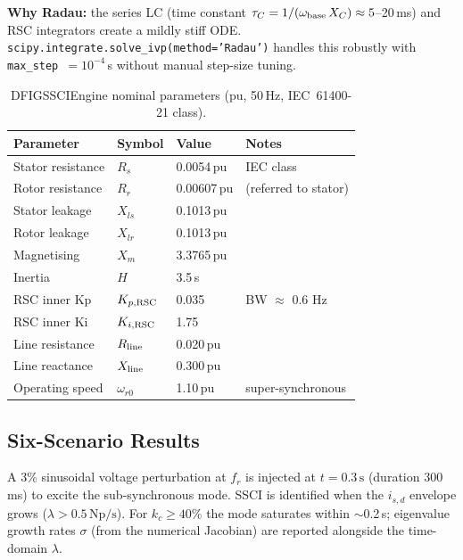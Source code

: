 \documentclass[11pt, a4paper]{article}
\begin{document}
\noindent\textbf{Why Radau:} the series LC (time constant
$\tau_C = 1/(\omega_{\rm base}\,X_C) \approx 5$--20\,ms) and RSC integrators
create a mildly stiff ODE.  \texttt{scipy.integrate.solve\_ivp(method='Radau')}
handles this robustly with \texttt{max\_step}~$= 10^{-4}$\,s without manual
step-size tuning.

\begin{table}[!t]
\centering
\caption{DFIGSSCIEngine nominal parameters (pu, 50\,Hz, IEC~61400-21 class).}
\label{tab:dfig_params}
\renewcommand{\arraystretch}{1.10}
\begin{tabular}{llll}
\toprule
Parameter & Symbol & Value & Notes \\
\midrule
Stator resistance  & $R_s$          & 0.0054\,pu   & IEC class \\
Rotor resistance   & $R_r$          & 0.00607\,pu  & (referred to stator) \\
Stator leakage     & $X_{ls}$       & 0.1013\,pu   & \\
Rotor leakage      & $X_{lr}$       & 0.1013\,pu   & \\
Magnetising        & $X_m$          & 3.3765\,pu   & \\
Inertia            & $H$            & 3.5\,s        & \\
RSC inner Kp       & $K_{p,\rm RSC}$& 0.035         & BW $\approx$ 0.6 Hz \\
RSC inner Ki       & $K_{i,\rm RSC}$& 1.75          & \\
Line resistance    & $R_{\rm line}$ & 0.020\,pu    & \\
Line reactance     & $X_{\rm line}$ & 0.300\,pu    & \\
Operating speed    & $\omega_{r0}$  & 1.10\,pu     & super-synchronous \\
\bottomrule
\end{tabular}
\end{table}

\subsection{Six-Scenario Results}

A 3\% sinusoidal voltage perturbation at $f_r$ is injected at $t = 0.3\,\text{s}$
(duration 300\,ms) to excite the sub-synchronous mode.  SSCI is identified
when the $i_{s,d}$ envelope grows ($\lambda > 0.5\,\text{Np/s}$).  For
$k_c \geq 40\%$ the mode saturates within $\sim$0.2\,s; eigenvalue growth
rates $\sigma$ (from the numerical Jacobian) are reported alongside the
time-domain $\lambda$.
\end{document}
